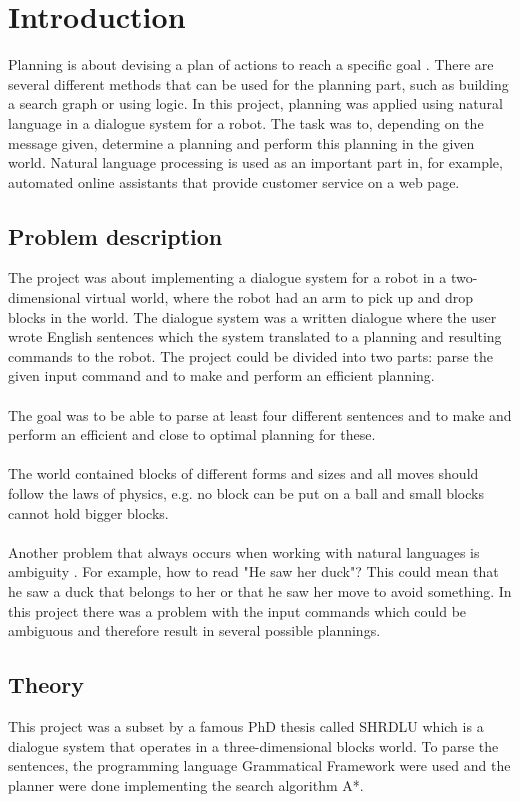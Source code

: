\chapter{Introduction}
Planning is about devising a plan of actions to reach a specific goal
\citep{planning_ai}. There are several different methods that can be used for
the planning part, such as building a search graph or using logic. In this
project, planning was applied using natural language in a dialogue system for a
robot. The task was to, depending on the message given, determine a planning
and perform this planning in the given world. Natural language processing is
used as an important part in, for example, automated online assistants that
provide customer service on a web page. 

\section{Problem description}
The project was about implementing a dialogue system for a robot in a
two-dimensional virtual world, where the robot had an arm to pick up and drop
blocks in the world. The dialogue system was a written dialogue where the user
wrote English sentences which the system translated to a planning and resulting
commands to the robot. The project could be divided into two parts: parse the
given input command and to make and perform an efficient planning. \\\\
The goal was to be able to parse at least four different sentences and to make
and perform an efficient and close to optimal planning for these. 
\\\\
The world contained blocks of different forms and sizes and all moves should
follow the laws of physics, e.g. no block can be put on a ball and small blocks
cannot hold bigger blocks. \\\\ Another problem that always occurs when working
with natural languages is ambiguity \citep{naturallang_ai}. For example, how to
read "He saw her duck"? This could mean that he saw a duck that belongs to her
or that he saw her move to avoid something. In this project there was a problem
with the input commands which could be ambiguous and therefore result in
several possible plannings. 

\section{Theory}
This project was a subset by a famous PhD thesis called SHRDLU which  is a
dialogue system that operates in a three-dimensional blocks world. To parse the
sentences, the programming language Grammatical Framework were used and the
planner were done implementing the search algorithm A*.

